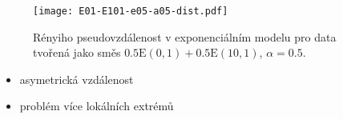 \documentclass[11pt,a4paper]{beamer}
\begin{document}
\begin{frame}
\begin{figure}
	\texttt{[image: E01-E101-e05-a05-dist.pdf]}	
	\caption{ Rényiho pseudovzdálenost v exponenciálním modelu pro data tvořená jako směs $0.5\mathrm{E}(0,1) + 0.5\mathrm{E}(10,1)$, $\alpha = 0.5.$}
\end{figure}
\begin{itemize}
	\item asymetrická vzdálenost 
	\item problém více lokálních extrémů
\end{itemize}
\end{frame}


%
%
\end{document}
